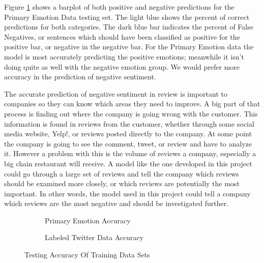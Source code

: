 \documentclass[titlepage,letterpaper]{article}
\begin{document}
Figure \ref{primemresult} shows a barplot of both positive and negative predictions for the Primary Emotion Data testing set. The light blue shows the percent of correct predictions for both categories. The dark blue bar indicates the percent of False Negatives, or sentences which should have been classified as positive for the positive bar, or negative in the negative bar. For the Primary Emotion data the model is most accurately predicting the positive emotions; meanwhile it isn't doing quite as well with the negative emotion group. We would prefer more accuracy in the prediction of negative sentiment. 

The accurate prediction of negative sentiment in review is important to companies so they can know which areas they need to improve. A big part of that process is finding out where the company is going wrong with the customer. This information is found in reviews from the customer, whether through some social media website, Yelp!, or reviews posted directly to the company. At some point the company is going to see the comment, tweet, or review and have to analyze it. However a problem with this is the volume of reviews a company, especially a big chain restaurant will receive. A model like the one developed in this project could go through a large set of reviews and tell the company which reviews should be examined more closely, or which reviews are potentially the most important. In other words, the model used in this project could tell a company which reviews are the most negative and should be investigated further.   


		
\begin{figure}[]
	\hfill
	\vspace*{-1in}
	\centering
	\begin{adjustwidth}{-.75in}{-.75in}
		
 \begin{subfigure}{3in}
 	\centering
 	\caption{Primary Emotion Accuracy}
	\resizebox{3in}{!}{}
	\label{primemresult}
\end{subfigure}
\hfill
\begin{subfigure}{3in}
	\centering
	\caption{Labeled Twitter Data Accuracy}
	\resizebox{3in}{!}{}
	\label{lbtwitresult}
\end{subfigure}
\hfill
\end{adjustwidth}
\caption{Testing Accuracy Of Training Data Sets}\label{duo_chart}
\end{figure}
\end{document}
